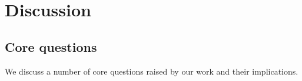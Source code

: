 \section{Discussion}
\label{sec:discussion}

\subsection{Core questions}
\label{sec:discussion:key-questions}

We discuss a number of core questions raised by our work and their implications.


